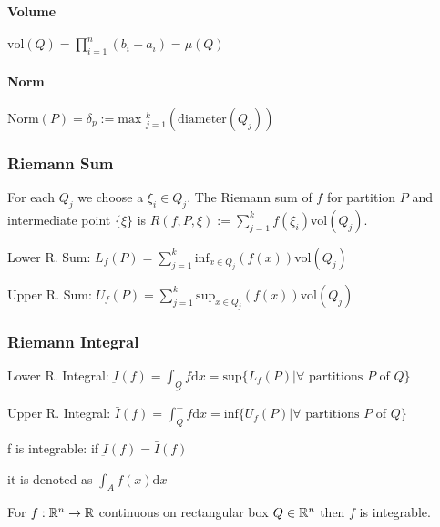 \paragraph{Volume}
$\text{vol}(Q) = \prod_{i = 1}^n (b_i - a_i) = \mu(Q) $

\paragraph{Norm}
$\text{Norm}(P) = \delta_p := \text{max }_{j = 1}^k(\text{diameter}(Q_j))$

\subsubsection{Riemann Sum}
For each $Q_j$ we choose a $\xi_i \in Q_j$. The Riemann sum of $f$ for partition $P$ and intermediate point $\{\xi\}$ is $R(f, P, \xi) := \sum_{j=1}^{k} f(\xi_i) \text{vol}(Q_j)$.

\begin{compactdesc}
    \item[Lower R. Sum:] $L_f(P) = \sum_{j=1}^{k} \text{inf}_{x \in Q_j} (f(x)) \text{vol}(Q_j)$
    \item[Upper R. Sum:] $U_f(P) = \sum_{j=1}^{k} \text{sup}_{x \in Q_j} (f(x)) \text{vol}(Q_j)$
\end{compactdesc}

\subsubsection{Riemann Integral}
\begin{compactdesc}
    \item[Lower R. Integral:] $\underbar{I}(f) = \int_{\underbar{Q}} f \mathrm{d}x = \text{sup}\{L_f(P) | \forall \text{ partitions } P \text{ of } Q\}$
    \item[Upper R. Integral:] $\bar{I}(f) = \int_{Q}^{-} f \mathrm{d}x = \text{inf}\{U_f(P) | \forall \text{ partitions } P \text{ of } Q\}$
    \item[f is integrable:] if $\underbar{I}(f) = \bar{I}(f)$
        \begin{compactitem}
            \item it is denoted as $\int_{A} f(x) \mathrm{d}x$
        \end{compactitem}
\end{compactdesc}

For $f: \mathbb{R}^n \to \mathbb{R}$ continuous on rectangular box $Q \in \mathbb{R}^n$ then $f$ is integrable.

